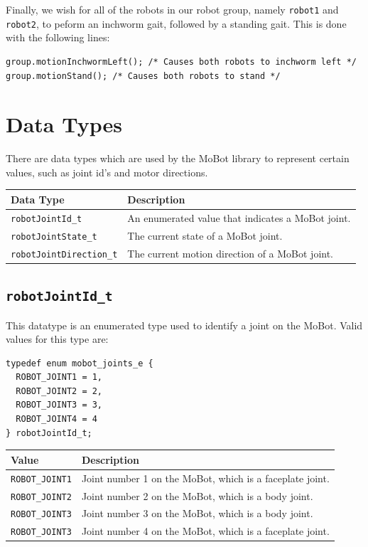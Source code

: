 \documentclass{article}
\begin{document}
Finally, we wish for all of the robots in our robot group, namely
\texttt{robot1} and \texttt{robot2}, to peform an inchworm gait, followed
by a standing gait. This is done with the following lines:

\begin{verbatim}
group.motionInchwormLeft(); /* Causes both robots to inchworm left */
group.motionStand(); /* Causes both robots to stand */
\end{verbatim}

\newpage
\appendix
\section{Data Types}
There are data types which are used by the MoBot library to represent 
certain values, such as joint id's and motor directions.

\begin{tabular}{p{3.5cm}p{10cm}} \hline 
Data Type& Description \\
\hline 
\texttt{robotJointId\_t} & An enumerated value that indicates a MoBot joint. \\
\texttt{robotJointState\_t} & The current state of a MoBot joint. \\
\texttt{robotJointDirection\_t} & The current motion direction of a MoBot joint. \\
\hline
\end{tabular}

\subsection{\label{sec:robotJointId_t}\texttt{robotJointId\_t}}
This datatype is an enumerated type used to identify a joint on the MoBot. Valid
values for this type are:
\begin{verbatim}
typedef enum mobot_joints_e {
  ROBOT_JOINT1 = 1,
  ROBOT_JOINT2 = 2,
  ROBOT_JOINT3 = 3,
  ROBOT_JOINT4 = 4
} robotJointId_t;
\end{verbatim}

\begin{tabular}{p{3cm}p{10cm}} \hline 
Value & Description \\
\hline 
\texttt{ROBOT\_JOINT1} & Joint number 1 on the MoBot, which is a faceplate joint. \\
\texttt{ROBOT\_JOINT2} & Joint number 2 on the MoBot, which is a body joint. \\
\texttt{ROBOT\_JOINT3} & Joint number 3 on the MoBot, which is a body joint. \\
\texttt{ROBOT\_JOINT3} & Joint number 4 on the MoBot, which is a faceplate joint. \\
\hline
\end{tabular}
\end{document}
